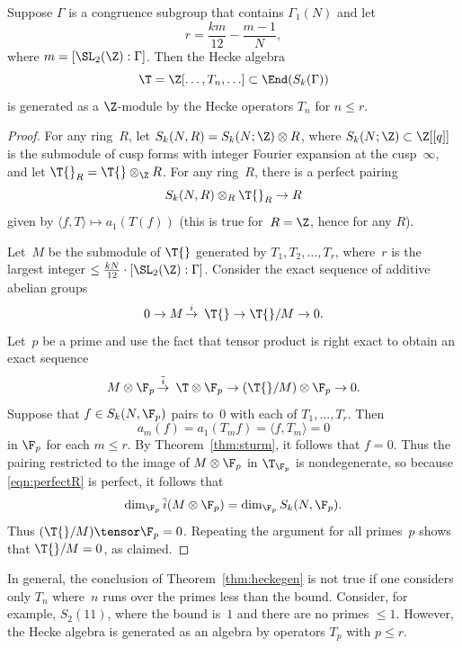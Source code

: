 \begin{theorem}\label{thm:heckegen}
Suppose $\Gamma$ is a congruence subgroup that contains
$\Gamma_1(N)$ and let 
\begin{equation}\label{eqn:perfectR}
  r=\frac{km}{12} - \frac{m - 1}{N},
\end{equation}
where $m=[\SL_2(\Z):\Gamma]$.
Then the Hecke algebra 
$$\T=\Z[\ldots, T_n,\ldots] \subset \End(S_k(\Gamma))$$
is generated as a $\Z$-module by the Hecke operators
$T_n$ for $n\leq r$.
\end{theorem}
\begin{proof}
  For any ring~$R$, let $S_k(N,R) = S_k(N;\Z)\otimes{}R$, where
  $S_k(N;\Z)\subset \Z[[q]]$ is the submodule of cusp forms with
  integer Fourier expansion at the cusp~$\infty$, and let $\T{}_R =
  \T{}\otimes_\Z R$.  For any ring~$R$, there is a perfect pairing 
$$S_k(N,R) \otimes_R \T{}_R \rightarrow R$$ 
given by $\langle f,T\rangle\mapsto a_1(T(f))$ (this is true
for~$R=\Z$, hence for any $R$).

  Let~$M$ be the submodule of $\T{}$ generated by
  $T_1,T_2,\ldots,T_r$, where~$r$ is the largest integer $\leq
  {\frac{kN}{12}}\cdot [\SL_2(\Z):\Gamma]$.
  Consider the exact sequence of additive abelian groups
  $$0\rightarrow M \mathop{\rightarrow}\limits^{i}\ \T{}
  \rightarrow \T{}/M \rightarrow 0.$$
  Let~$p$ be a prime and use the fact that
  tensor product is right exact to obtain an exact sequence
  $$M\otimes \F_p \mathop{\rightarrow}\limits^{\overline{i}}\ 
    \T \otimes\F_p \rightarrow (\T{}/M)\otimes\F_p\rightarrow 0.$$
  Suppose that $f\in S_k(N,\F_p)$ pairs to~$0$ with each of
  $T_1,\ldots, T_r$.  Then $$a_m(f)=a_1(T_m f)=\langle f, T_m\rangle =
  0$$ in $\F_p$ for each $m\leq r$.  By Theorem~\ref{thm:sturm}, it
  follows that $f = 0$. Thus the pairing restricted to the image of
  $M\otimes\F_p$ in $\T_{\F_p}$ is nondegenerate, so
because \eqref{eqn:perfectR} is perfect, it follows that
  $$
  \dim_{\F_p} \overline{i}(M\otimes\F_p) =  \dim_{\F_p} S_k(N,\F_p).
  $$
  Thus $(\T{}/M) \tensor \F_p = 0$. 
  Repeating the argument for all primes~$p$ shows that $\T{}/M=0$, 
  as claimed.
\end{proof}


\begin{remark}
In general, the conclusion of 
Theorem~\ref{thm:heckegen} is not true if one considers only
 $T_n$ where~$n$ runs over the primes less than the bound.
Consider, for example, $S_2(11)$, where the bound is~$1$ and
there are no primes $\leq 1$. 
However, the Hecke algebra is generated as an algebra
by operators $T_p$ with $p\leq r$.
\end{remark}




